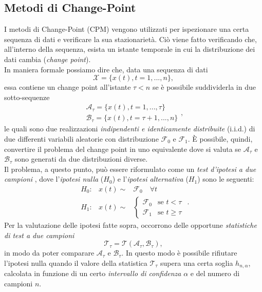 \subsection{Metodi di Change-Point}
I metodi di Change-Point (CPM) vengono utilizzati per ispezionare una certa sequenza di dati e verificare la sua stazionariet\`a. 
Ci\`o viene fatto verificando che, all'interno della sequenza, esista un istante temporale in cui la distribuzione dei dati cambia (\textit{change point}).\\
In maniera formale possiamo dire che, data una sequenza di dati
\[\mathcal{X}=\{x(t), t = 1,...,n\},\]
essa contiene un change point all'istante $\tau < n$ se \`e possibile
suddividerla in due sotto-sequenze
\[ \begin{array}{l}
\mathcal{A}_\tau = \{x(t), t = 1,...,\tau \}\\
 \mathcal{B}_\tau = \{x(t), t = \tau + 1,...,n \}
\end{array},\]
le quali sono due realizzazioni \textit{indipendenti e identicamente distribuite} (i.i.d.) di due differenti variabili aleatorie con distribuzione $ \mathcal{F}_0 $ e $ \mathcal{F}_1 $.
\`E possibile, quindi,  convertire il problema del change point in uno equivalente dove si valuta se $ \mathcal{A}_\tau $ e $ \mathcal{B}_\tau $ sono generati da due distribuzioni diverse.\\
Il problema, a questo punto, pu\`o essere riformulato come un \textit{test d'ipotesi a due campioni} \cite{ross2009introduction}, dove l'\textit{ipotesi nulla} ($ H_0 $) e l'\textit{ipotesi alternativa} ($ H_1 $) sono le seguenti:
\[ \begin{array}{rcl}
H_0: &  x(t) \sim &  \mathcal{F}_0 \quad  \forall t \\
H_1: &  x(t) \sim &
\begin{cases}
\mathcal{F}_{0} & \text{se } t < \tau \\
\mathcal{F}_{1} & \text{se } t \geq \tau
\end{cases}
\end{array}. \]
Per la valutazione delle ipotesi fatte sopra, occorrono delle opportune \textit{statistiche di test a due campioni} 
\[ \mathcal{T}_\tau = \mathcal{T}(\mathcal{A}_\tau, \mathcal{B}_\tau), \]
in modo da poter comparare $ \mathcal{A}_\tau $ e $ \mathcal{B}_\tau $. In questo modo \`e possibile rifiutare l'ipotesi nulla quando il valore della statistica $ \mathcal{T}_\tau $ supera una certa soglia $ h_{n,\alpha} $, calcolata in funzione di un certo \textit{intervallo di confidenza} $ \alpha $ e del numero di campioni $ n $.\\
